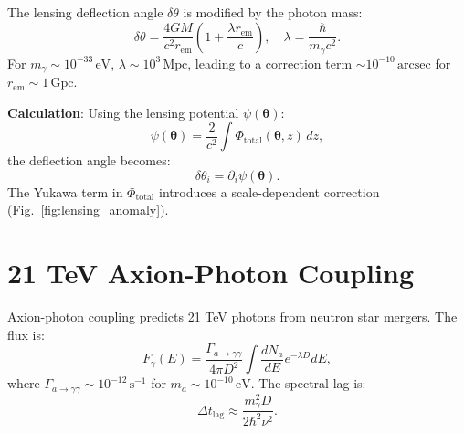 \documentclass[12pt, a4paper]{article}
\begin{document}
The lensing deflection angle \( \delta \theta \) is modified by the photon mass:  
\begin{equation}  
\delta \theta = \frac{4GM}{c^2 r_{\text{em}}} \left(1 + \frac{\lambda r_{\text{em}}}{c}\right), \quad \lambda = \frac{\hbar}{m_\gamma c^2}.  
\label{eq:lensing}  
\end{equation}  
For \( m_\gamma \sim 10^{-33} \, \text{eV} \), \( \lambda \sim 10^3 \, \text{Mpc} \), leading to a correction term \( \sim 10^{-10} \, \text{arcsec} \) for \( r_{\text{em}} \sim 1 \, \text{Gpc} \).  

\textbf{Calculation}:  
Using the lensing potential \( \psi(\bm{\theta}) \):  
\begin{equation}  
\psi(\bm{\theta}) = \frac{2}{c^2} \int \Phi_{\text{total}}(\bm{\theta}, z) \, dz,  
\label{eq:lensing_potential}  
\end{equation}  
the deflection angle becomes:  
\begin{equation}  
\delta \theta_i = \partial_i \psi(\bm{\theta}).  
\label{eq:deflection}  
\end{equation}  
The Yukawa term in \( \Phi_{\text{total}} \) introduces a scale-dependent correction (Fig.~\ref{fig:lensing_anomaly}).  

\section{21 TeV Axion-Photon Coupling}  
\label{sec:axion}  

Axion-photon coupling predicts 21 TeV photons from neutron star mergers. The flux is:  
\begin{equation}  
F_\gamma(E) = \frac{\Gamma_{a \to \gamma\gamma}}{4\pi D^2} \int \frac{dN_a}{dE} e^{-\lambda D} dE,  
\label{eq:axion_flux}  
\end{equation}  
where \( \Gamma_{a \to \gamma\gamma} \sim 10^{-12} \, \text{s}^{-1} \) for \( m_a \sim 10^{-10} \, \text{eV} \). The spectral lag is:  
\begin{equation}  
\Delta t_{\text{lag}} \approx \frac{m_\gamma^2 D}{2\hbar^2 \nu^2}.  
\label{eq:lag}  
\end{equation}  
\end{document}
